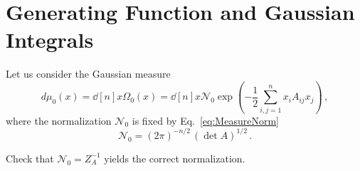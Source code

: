 \documentclass[notes.tex]{subfiles}
\begin{document}
\section{Generating Function and Gaussian Integrals}
\label{sec:gener-funct-gauss}

Let us consider the Gaussian measure
\begin{equation}
  \label{eq:GaussMeas}
  d\mu_0(x) = \dd[n]{x} \Omega_0(x) = \dd[n]{x} \mathcal{N}_0 \exp\left(
    -\frac12 \sum_{i,j=1}^n x_i A_{ij} x_j
    \right)\, ,
\end{equation}
where the normalization $\mathcal{N}_0$ is fixed by Eq.~\ref{eq:MeasureNorm}
\begin{equation}
  \label{eq:GaussNorm}
  \mathcal{N}_0 = \left(2\pi\right)^{-n/2}\, \left( \det A\right)^{1/2}\, .
\end{equation}

\begin{Ex}
  Check that $\mathcal{N}_0=Z_A^{-1}$ yields the correct normalization. 
\end{Ex}
\end{document}
